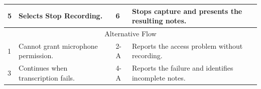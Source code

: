 \begin{reporttable}
\begin{tabular}{|p{}|p{}|p{}|p{}|p{}|}
5 & \multicolumn{2}{p{\dimexpr0.37\textwidth+2\tabcolsep+\arrayrulewidth\relax}|}{Selects Stop Recording.} & 6 & Stops capture and presents the resulting notes. \\ \hline
\multicolumn{5}{|c|}{Alternative Flow} \\ \hline
1 & \multicolumn{2}{p{\dimexpr0.37\textwidth+2\tabcolsep+\arrayrulewidth\relax}|}{Cannot grant microphone permission.} & 2-A & Reports the access problem without recording. \\ \hline
3 & \multicolumn{2}{p{\dimexpr0.37\textwidth+2\tabcolsep+\arrayrulewidth\relax}|}{Continues when transcription fails.} & 4-A & Reports the failure and identifies incomplete notes. \\ \hline
\end{tabular}
\end{reporttable}

